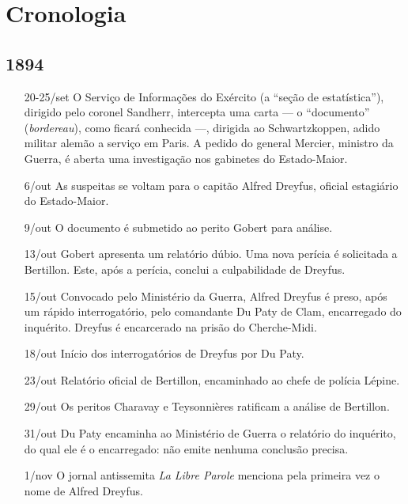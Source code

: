 \chapter{Cronologia}

\section{1894}
\begin{itemize}
\setlength\itemsep{-1mm}
\item[20-25/set] O Serviço de Informações do Exército (a ``seção de
estatística''), dirigido pelo coronel Sandherr, intercepta uma carta --- o
``documento'' (\textit{bordereau}), como ficará conhecida ---, dirigida ao
Schwartzkoppen, adido militar alemão a serviço em Paris. A pedido do general
Mercier, ministro da Guerra, é aberta uma investigação nos gabinetes do
Estado-Maior. 

\item[6/out] As suspeitas se voltam para o capitão Alfred Dreyfus, oficial estagiário do Estado-Maior.

\item[9/out] O documento é submetido ao perito Gobert para análise. 

\item[13/out] Gobert apresenta um relatório dúbio. Uma nova perícia é
solicitada a Bertillon. Este, após a perícia, conclui a culpabilidade de
Dreyfus.

\item[15/out] Convocado pelo Ministério da Guerra, Alfred Dreyfus é preso, após
um rápido interrogatório, pelo comandante Du Paty de Clam, encarregado do
inquérito. Dreyfus é encarcerado na prisão do Cherche-Midi.

\item[18/out] Início dos interrogatórios de Dreyfus por Du Paty.

\item[23/out] Relatório oficial de Bertillon, encaminhado ao chefe de polícia
Lépine.

\item[29/out] Os peritos Charavay e Teysonnières ratificam a análise de
Bertillon.

\item[31/out] Du Paty encaminha ao Ministério de Guerra o relatório do
inquérito, do qual ele é o encarregado: não emite nenhuma conclusão precisa.

\item[1/nov] O jornal antissemita \textit{La Libre Parole} menciona pela
primeira vez o nome de Alfred Dreyfus.


\end{itemize}

